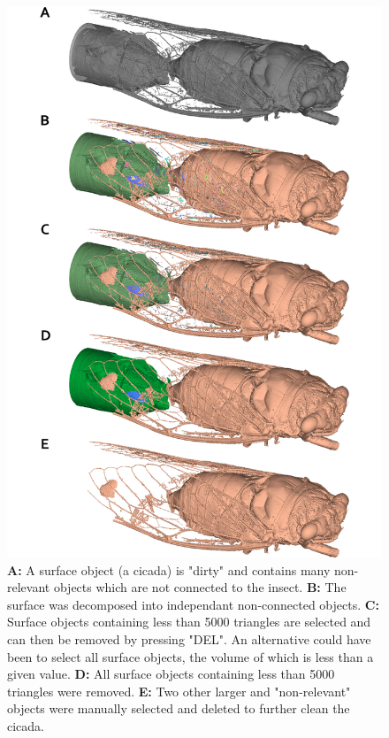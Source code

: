\begin{figure}
  \centering
  \includegraphics[scale=0.35]{images/09/remove_small_objects/cigale.png} 
	\caption{\textbf{A:} A surface object (a cicada) is "dirty" and contains many non-relevant objects which are not connected to the insect. \textbf{B:} The surface was decomposed into independant non-connected objects. \textbf{C:} Surface objects containing less than 5000 triangles are selected and can then be removed by pressing "DEL". An alternative could have been to select all surface objects, the volume of which is less than a given value. \textbf{D:} All surface objects containing less than 5000 triangles were removed. \textbf{E:} Two other larger and "non-relevant" objects were manually selected and deleted to further clean the cicada.
	}
 \label{cicada}
\end{figure}
